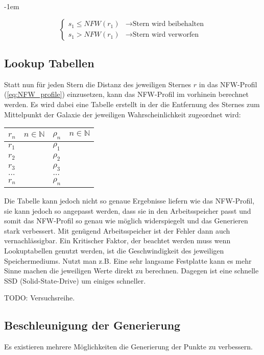 \kern-1em

\begin{equation}\label{cases:random_sampling}
\begin{cases}
s_1 \leq NFW(r_1) & \rightarrow \text{Stern wird beibehalten}\\
s_1 > NFW(r_1) & \rightarrow \text{Stern wird verworfen}
\end{cases} 
\end{equation}


\subsection{Lookup Tabellen}
Statt nun für jeden Stern die Distanz des jeweiligen Sternes \( r \) in das
NFW-Profil (\ref{eq:NFW_profile}) einzusetzen, kann das NFW-Profil im vorhinein
berechnet werden. Es wird dabei eine Tabelle erstellt in der die Entfernung des
Sternes zum Mittelpunkt der Galaxie der jeweiligen Wahrscheinlichkeit
zugeordnet wird:

\begin{center}
\begin{tabular} {l | l}
    \( r_n \quad n \in \mathbb{N} \) & \( \rho_n \quad n \in \mathbb{N} \) \\ \hline\hline
    \( r_1 \) & \( \rho_1 \) \\ \hline
    \( r_2 \) & \( \rho_2 \) \\ \hline
    \( r_3 \) & \( \rho_3 \) \\ \hline
    \( \dots \) & \( \dots \) \\ \hline
    \( r_n \) & \( \rho_n \) \\
\end{tabular}
\end{center}

Die Tabelle kann jedoch nicht so genaue Ergebnisse liefern wie das NFW-Profil,
sie kann jedoch so angepasst werden, dass sie in den Arbeitsspeicher passt und
somit das NFW-Profil so genau wie möglich widerspiegelt und das Generieren
stark verbessert. Mit genügend Arbeitsspeicher ist der Fehler dann auch
vernachlässigbar.  Ein Kritischer Faktor, der beachtet werden muss wenn
Lookuptabellen genutzt werden, ist die Geschwindigkeit des jeweiligen
Speichermediums. Nutzt man z.B. Eine sehr langsame Festplatte kann es mehr
Sinne machen die jeweiligen Werte direkt zu berechnen. Dagegen ist eine
schnelle SSD (Solid-State-Drive) um einiges schneller.

TODO: Versuchsreihe.

\subsection{Beschleunigung der Generierung}
Es existieren mehrere Möglichkeiten die Generierung der Punkte zu verbessern.

